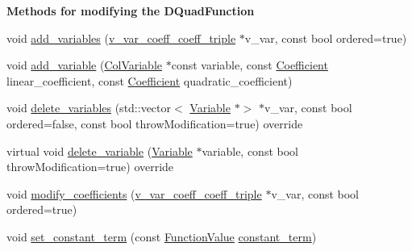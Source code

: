 \begin{Indent}\textbf{ Methods for modifying the D\+Quad\+Function}\par
\begin{DoxyCompactItemize}
\item 
void \mbox{\hyperlink{class_s_m_spp__di__unipi__it_1_1_d_quad_function_ae6b094640d919cd6f2f9c226aa32417d}{add\+\_\+variables}} (\mbox{\hyperlink{class_s_m_spp__di__unipi__it_1_1_d_quad_function_adaced695e00a65836eb558a7bfbd85f4}{v\+\_\+var\+\_\+coeff\+\_\+coeff\+\_\+triple}} $\ast$v\+\_\+var, const bool ordered=true)
\item 
void \mbox{\hyperlink{class_s_m_spp__di__unipi__it_1_1_d_quad_function_ac33c70ad7cab1b92406bea65783e4891}{add\+\_\+variable}} (\mbox{\hyperlink{class_s_m_spp__di__unipi__it_1_1_col_variable}{Col\+Variable}} $\ast$const variable, const \mbox{\hyperlink{class_s_m_spp__di__unipi__it_1_1_d_quad_function_a1fa0f848dbb8d52dc62a1adfee1a1f90}{Coefficient}} linear\+\_\+coefficient, const \mbox{\hyperlink{class_s_m_spp__di__unipi__it_1_1_d_quad_function_a1fa0f848dbb8d52dc62a1adfee1a1f90}{Coefficient}} quadratic\+\_\+coefficient)
\item 
void \mbox{\hyperlink{class_s_m_spp__di__unipi__it_1_1_d_quad_function_af3b44e4a29223544fb46e2bed7700fed}{delete\+\_\+variables}} (std\+::vector$<$ \mbox{\hyperlink{class_s_m_spp__di__unipi__it_1_1_variable}{Variable}} $\ast$$>$ $\ast$v\+\_\+var, const bool ordered=false, const bool throw\+Modification=true) override
\item 
virtual void \mbox{\hyperlink{class_s_m_spp__di__unipi__it_1_1_d_quad_function_aba06752e8038f74383bb0890735fc564}{delete\+\_\+variable}} (\mbox{\hyperlink{class_s_m_spp__di__unipi__it_1_1_variable}{Variable}} $\ast$variable, const bool throw\+Modification=true) override
\item 
void \mbox{\hyperlink{class_s_m_spp__di__unipi__it_1_1_d_quad_function_aefa341ebfc281c57164e8a1027c0639f}{modify\+\_\+coefficients}} (\mbox{\hyperlink{class_s_m_spp__di__unipi__it_1_1_d_quad_function_adaced695e00a65836eb558a7bfbd85f4}{v\+\_\+var\+\_\+coeff\+\_\+coeff\+\_\+triple}} $\ast$v\+\_\+var, const bool ordered=true)
\item 
\mbox{\label{class_s_m_spp__di__unipi__it_1_1_d_quad_function_adda9c1bbf589cd093eba1136d923f676}} 
void \mbox{\hyperlink{class_s_m_spp__di__unipi__it_1_1_d_quad_function_adda9c1bbf589cd093eba1136d923f676}{set\+\_\+constant\+\_\+term}} (const \mbox{\hyperlink{class_s_m_spp__di__unipi__it_1_1_function_a9ad432406b609e28d340f73e9474bffe}{Function\+Value}} \mbox{\hyperlink{class_s_m_spp__di__unipi__it_1_1_d_quad_function_aa283d6643e75fd5914c89702b4f6b657}{constant\+\_\+term}})
$$
\end{DoxyCompactItemize}
\end{Indent}
